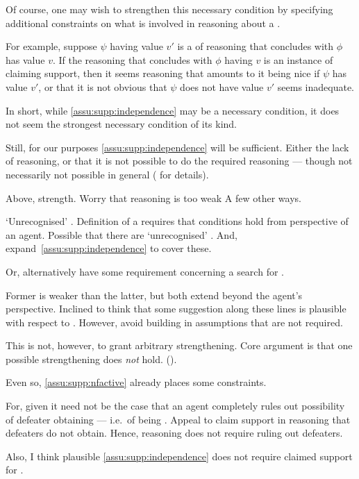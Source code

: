 \begin{note}[Strengthen?]
  Of course, one may wish to strengthen this necessary condition by specifying additional constraints on what is involved in reasoning about a \requ{}.

  For example, suppose \(\psi\) having value \(v'\) is a \requ{} of reasoning that concludes with \(\phi\) has value \(v\).
  If the reasoning that concludes with \(\phi\) having \(v\) is an instance of claiming support, then it seems reasoning that amounts to it being nice if \(\psi\) has value \(v'\), or that it is not obvious that \(\psi\) does not have value \(v'\) seems inadequate.

  In short, while \autoref{assu:supp:independence} may be a necessary condition, it does not seem the strongest necessary condition of its kind.

  Still, for our purposes \autoref{assu:supp:independence} will be sufficient.
  Either the lack of reasoning, or that it is not possible to do the required reasoning --- though not necessarily not possible in general (\nI{} for details).
\end{note}

\begin{note}
  Above, strength.
  Worry that reasoning is too weak
  A few other ways.

  `Unrecognised' .
  Definition of a \requ{} requires that conditions hold from perspective of an agent.
  Possible that there are `unrecognised' .
  And, expand~\autoref{assu:supp:independence} to cover these.

  Or, alternatively have some requirement concerning a search for .

  Former is weaker than the latter, but both extend beyond the agent's perspective.
  Inclined to think that some suggestion along these lines is plausible with respect to \ideaCSB{}.
  However, avoid building in assumptions that are not required.

  This is not, however, to grant arbitrary strengthening.
  Core argument is that one possible strengthening does \emph{not} hold. (\ESU{}).
\end{note}

\begin{note}
  Even so, \ref{assu:supp:nfactive} already places some constraints.

  For, given \nfcs{} it need not be the case that an agent completely rules out possibility of defeater obtaining --- i.e.\ of being \mom{}.
  Appeal to claim support in reasoning that defeaters do not obtain.
  Hence, reasoning does not require ruling out defeaters.

  Also, I think plausible \autoref{assu:supp:independence} does not require claimed support for .
\end{note}


